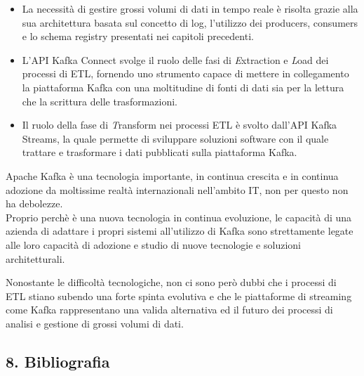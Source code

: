 \documentclass[]{article}
\providecommand{\tightlist}{%
  \setlength{\itemsep}{0pt}\setlength{\parskip}{0pt}}
\begin{document}
\begin{itemize}
\tightlist
\item
  La necessità di gestire grossi volumi di dati in tempo reale è risolta
  grazie alla sua architettura basata sul concetto di log, l'utilizzo
  dei producers, consumers e lo schema registry presentati nei capitoli
  precedenti.
\item
  L'API Kafka Connect svolge il ruolo delle fasi di \emph{E}xtraction e
  \emph{L}oad dei processi di ETL, fornendo uno strumento capace di
  mettere in collegamento la piattaforma Kafka con una moltitudine di
  fonti di dati sia per la lettura che la scrittura delle
  trasformazioni.
\item
  Il ruolo della fase di \emph{T}ransform nei processi ETL è svolto
  dall'API Kafka Streams, la quale permette di sviluppare soluzioni
  software con il quale trattare e trasformare i dati pubblicati sulla
  piattaforma Kafka.
\end{itemize}

Apache Kafka è una tecnologia importante, in continua crescita e in
continua adozione da moltissime realtà internazionali nell'ambito IT,
non per questo non ha debolezze.\\
Proprio perchè è una nuova tecnologia in continua evoluzione, le
capacità di una azienda di adattare i propri sistemi all'utilizzo di
Kafka sono strettamente legate alle loro capacità di adozione e studio
di nuove tecnologie e soluzioni architetturali.

Nonostante le difficoltà tecnologiche, non ci sono però dubbi che i
processi di ETL stiano subendo una forte spinta evolutiva e che le
piattaforme di streaming come Kafka rappresentano una valida alternativa
ed il futuro dei processi di analisi e gestione di grossi volumi di
dati.

\newpage

\subsection{8. Bibliografia}\label{bibliografia}
\end{document}
